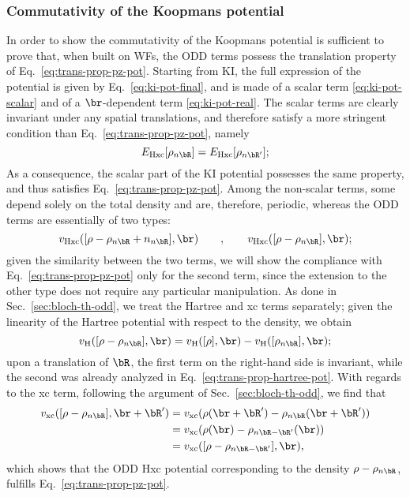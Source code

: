 \subsubsection*{Commutativity of the Koopmans potential}
In order to show the commutativity of the Koopmans potential is sufficient to prove that, when built on WFs, the ODD terms possess the translation property of Eq.~\eqref{eq:trans-prop-pz-pot}. Starting from KI, the full expression of the potential is given by Eq.~\eqref{eq:ki-pot-final}, and is made of a scalar term \eqref{eq:ki-pot-scalar} and of a $\br$-dependent term \eqref{eq:ki-pot-real}. The scalar terms are clearly invariant under any spatial translations, and therefore satisfy a more stringent condition than Eq.~\eqref{eq:trans-prop-pz-pot}, namely
%
\begin{equation}
    E_{\rm Hxc}[\rho_{n\bR}] = E_{\rm Hxc}[\rho_{n\bR'}] ;
\end{equation}
%
As a consequence, the scalar part of the KI potential possesses the same property, and thus satisfies Eq.~\eqref{eq:trans-prop-pz-pot}. Among the non-scalar terms, some depend solely on the total density and are, therefore, periodic, whereas the ODD terms are essentially of two types:
%
\begin{equation}
    v_{\rm Hxc}([\rho-\rho_{n\bR}+n_{n\bR}],\br)
    \qquad , \qquad
    v_{\rm Hxc}([\rho-\rho_{n\bR}],\br) ;
\end{equation}
%
given the similarity between the two terms, we will show the compliance with Eq.~\eqref{eq:trans-prop-pz-pot} only for the second term, since the extension to the other type does not require any particular manipulation. As done in Sec.~\ref{sec:bloch-th-odd}, we treat the Hartree and xc terms separately; given the linearity of the Hartree potential with respect to the density, we obtain
%
\begin{equation}
    v_{\rm H}([\rho-\rho_{n\bR}],\br) = v_{\rm H}([\rho],\br) - v_{\rm H}([\rho_{n\bR}],\br) ;
\end{equation}
%
upon a translation of $\bR$, the first term on the right-hand side is invariant, while the second was already analyzed in Eq.~\eqref{eq:trans-prop-hartree-pot}. With regards to the xc term, following the argument of Sec.~\ref{sec:bloch-th-odd}, we find that
%
\begin{equation}
    \begin{split}
        v_{\rm xc}([\rho-\rho_{n\bR}],\br+\bR') &= v_{\rm xc} (\rho(\br+\bR') - \rho_{n\bR}(\br+\bR')) \\
        &= v_{\rm xc}(\rho(\br) - \rho_{n\bR-\bR'}(\br)) \\
        &= v_{\rm xc}([\rho-\rho_{n\bR-\bR'}],\br) ,
    \end{split}
\end{equation}
%
which shows that the ODD Hxc potential corresponding to the density $\rho-\rho_{n\bR}$, fulfills Eq.~\eqref{eq:trans-prop-pz-pot}.

